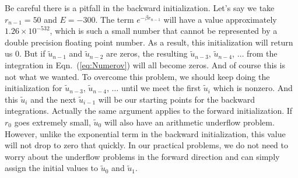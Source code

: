 Be careful there is a pitfall in the backward initialization. Let's say we take
$r_{n-1} = 50$ and $E = -300$. The term $e^{-\beta r_{n-1}}$ will have
a value approximately $1.26\times10^{-532}$, which is such a small number that
cannot be represented by a double precision floating point number. As a result,
this initialization will return us $0$.
But if $\tilde{u}_{n-1}$ and $\tilde{u}_{n-2}$ are zeros, the resulting
$\tilde{u}_{n-3}$, $\tilde{u}_{n-4}$, $\ldots$ from the integration
in Eqn.~(\ref{eq:Numerov}) will all become zeros.
And of course this is not what we wanted. To overcome this problem, we should
keep doing the initialization for $\tilde{u}_{n-3}$, $\tilde{u}_{n-4}$, $\ldots$
until we meet the first $\tilde{u}_i$ which is nonzero. And this $\tilde{u}_i$
and the next $\tilde{u}_{i-1}$ will be our starting points for the backward integrations.
Actually the same argument applies to the forward initialization. If $r_0$
goes extremely small, $\tilde{u}_0$ will also have an arithmetic underflow
problem. However, unlike the exponential term in the backward initialization,
this value will not drop to zero that quickly. In our practical problems, we do
not need to worry about the underflow problems in the forward direction and can simply
assign the initial values to $\tilde{u}_0$ and $\tilde{u}_1$.

